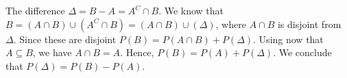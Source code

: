 
\setcounter{theorem}{43}

\begin{exercise}[BH.1.44]
\begin{solution}
	The difference $\Delta = B-A=A^{C}\cap B$. We know that $B = (A\cap B)\cup ( A^{C}\cap B) = (A\cap B)\cup (\Delta)$, where $A\cap B$ is disjoint from $\Delta$. Since these are disjoint $P(B) = P(A\cap B) + P(\Delta)$. Using now that $A\subseteq B$, we have $A\cap B = A$. Hence, $P(B) = P(A) + P(\Delta)$. We conclude that $P(\Delta) = P(B)-P(A)$.
\end{solution}
\end{exercise}


